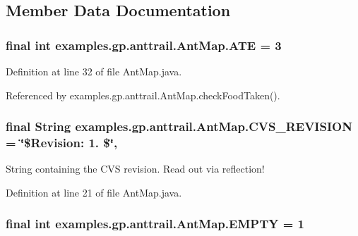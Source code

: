 \subsection{Member Data Documentation}
\hypertarget{classexamples_1_1gp_1_1anttrail_1_1_ant_map_a05a7ff98925e4a8fdd57f374d4f6f562}{
\subsubsection[{A\-T\-E}]{\setlength{\rightskip}{0pt plus 5cm}final int examples.\-gp.\-anttrail.\-Ant\-Map.\-A\-T\-E = 3\hspace{0.3cm}{\ttfamily [static]}}}\label{classexamples_1_1gp_1_1anttrail_1_1_ant_map_a05a7ff98925e4a8fdd57f374d4f6f562}


Definition at line 32 of file Ant\-Map.\-java.



Referenced by examples.\-gp.\-anttrail.\-Ant\-Map.\-check\-Food\-Taken().

\hypertarget{classexamples_1_1gp_1_1anttrail_1_1_ant_map_a8b73287edca9a18868ff1b89ccb39843}{
\subsubsection[{C\-V\-S\-\_\-\-R\-E\-V\-I\-S\-I\-O\-N}]{\setlength{\rightskip}{0pt plus 5cm}final String examples.\-gp.\-anttrail.\-Ant\-Map.\-C\-V\-S\-\_\-\-R\-E\-V\-I\-S\-I\-O\-N = \char`\"{}\$Revision\-: 1. \$\char`\"{}\hspace{0.3cm}{\ttfamily [static]}, {\ttfamily [private]}}}\label{classexamples_1_1gp_1_1anttrail_1_1_ant_map_a8b73287edca9a18868ff1b89ccb39843}
String containing the C\-V\-S revision. Read out via reflection! 

Definition at line 21 of file Ant\-Map.\-java.

\hypertarget{classexamples_1_1gp_1_1anttrail_1_1_ant_map_adc109e91c5e271d11e8777732e872d96}{
\subsubsection[{E\-M\-P\-T\-Y}]{\setlength{\rightskip}{0pt plus 5cm}final int examples.\-gp.\-anttrail.\-Ant\-Map.\-E\-M\-P\-T\-Y = 1\hspace{0.3cm}{\ttfamily [static]}}}\label{classexamples_1_1gp_1_1anttrail_1_1_ant_map_adc109e91c5e271d11e8777732e872d96}


